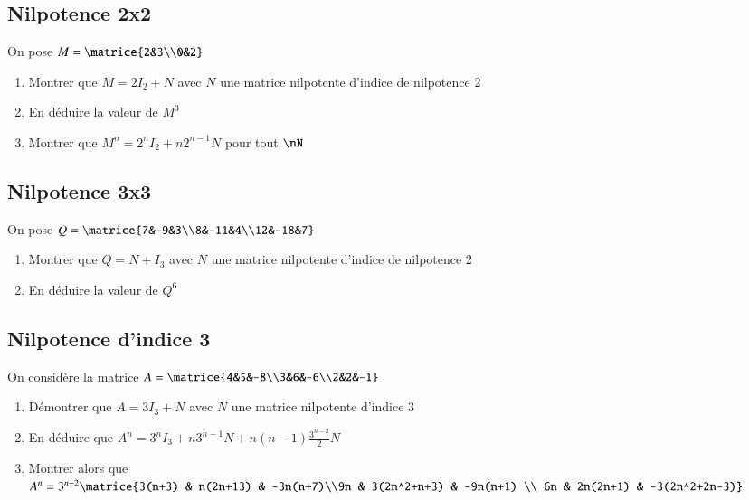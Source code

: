 \documentclass[oneside,12pt]{article}          %
\begin{document}
\subsection{Nilpotence 2x2}
On pose $M=\matrice{2&3\\0&2} $
    \begin{enumerate}
        \item Montrer que $M=2I_2+N$ avec $N$ une matrice nilpotente d'indice de nilpotence 2
        \item En déduire la valeur de $M^3$
        \item Montrer que $M^n=2^nI_2+n2^{n-1}N$ pour tout $\nN$
    \end{enumerate}
    

    
\subsection{Nilpotence 3x3}
On pose $Q=\matrice{7&-9&3\\8&-11&4\\12&-18&7} $ 
    \begin{enumerate}
        \item Montrer que $Q=N+I_3$ avec $N$ une matrice nilpotente d'indice de nilpotence 2
        \item En déduire la valeur de $Q^6$
    \end{enumerate}



\subsection{Nilpotence d'indice 3}
On considère la matrice $A=\matrice{4&5&-8\\3&6&-6\\2&2&-1}$
\begin{enumerate}
    \item Démontrer que $A=3I_3+N$ avec $N$ une matrice nilpotente d'indice 3
    \item En déduire que $A^n=3^nI_3+n3^{n-1}N+n(n-1)\frac{3^{n-2}}{2}N$
    \item Montrer alors que $A^n=3^{n-2}\matrice{3(n+3) & n(2n+13) & -3n(n+7)\\9n & 3(2n^2+n+3) & -9n(n+1) \\ 6n & 2n(2n+1) & -3(2n^2+2n-3)}$
\end{enumerate}
\end{document}
